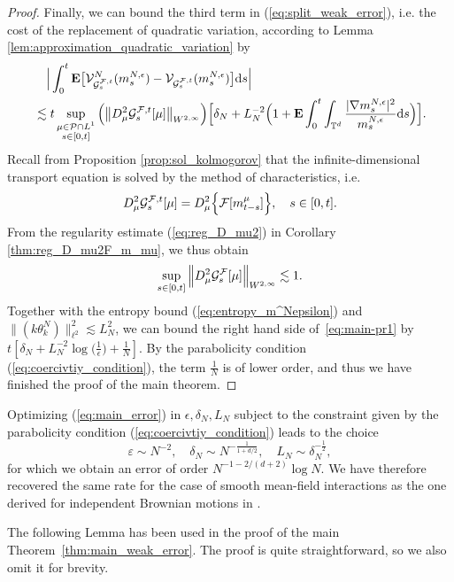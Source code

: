 \begin{proof}
Finally, we can bound the third term in (\ref{eq:split_weak_error}), i.e. the cost of the replacement of quadratic variation, according to Lemma \ref{lem:approximation_quadratic_variation} by
\begin{equation}\label{eq:main-pr1}
\begin{split}
     &\quad \Big|\int_0^t \mathbf{E}\big[\mathcal{V}^N_{\mathcal{G}_s^{\mathcal{F},t}}(m_s^{N,\epsilon}) - \mathcal{V}_{\mathcal{G}_s^{\mathcal{F},t}}(m_s^{N,\epsilon})\big]\mathrm{d}s\Big|\\
     &\lesssim t\sup_{\substack{\mu \in \mathcal{P} \cap L^1\\s \in [0,t]}}\Big(\big\|D^2_{\mu}\mathcal{G}^{\mathcal{F},t}_s[\mu]\big\|_{W^{2,\infty}}\Big)\Big[\delta_N + L_N^{-2}\Big(1 + \mathbf{E}\int_0^t\int_{\mathbb{T}^d}\frac{|\nabla m_s^{N,\epsilon}|^2}{m_s^{N,\epsilon}}\mathrm{d}s\Big)\Big].
\end{split}
\end{equation}
Recall from Proposition \ref{prop:sol_kolmogorov} that the infinite-dimensional transport equation is solved by the method of characteristics, i.e.
\[
D^2_{\mu} \mathcal{G}^{\mathcal{F},t}_s[\mu] = D^2_{\mu} \Big\{\mathcal{F}[m^{\mu}_{t-s}]\Big\}, \quad s \in [0,t].
\]
From the regularity estimate (\ref{eq:reg_D_mu2}) in Corollary \ref{thm:reg_D_mu2F_m_mu}, we thus obtain
\begin{align*}
    \sup_{s \in [0,t]}\Big\|D^2_{\mu} \mathcal{G}^{\mathcal{F}}_s[\mu]\Big\|_{W^{2,\infty}} \lesssim  1.
\end{align*}
Together with the entropy bound (\ref{eq:entropy_m^Nepsilon}) and $\|(k\theta_k^N)\|_{\ell^2}^2 \lesssim L_N^2$, we can bound the right hand side of~\eqref{eq:main-pr1} by $t [\delta_N + L_N^{-2} \log\big(\frac1\epsilon\big) + \frac{1}{N}]$. By the parabolicity condition (\ref{eq:coercivtiy_condition}), the term $\frac1N$ is of lower order, and thus we have finished the proof of the main theorem.
\end{proof}

\begin{rem}Optimizing (\ref{eq:main_error}) in $\epsilon, \delta_N, L_N$ subject to the constraint given by the parabolicity condition (\ref{eq:coercivtiy_condition}) leads to the choice 
\begin{equation}
   \varepsilon \sim N^{-2}, \quad \delta_N \sim N^{-\frac{1}{1+d/2}},\quad L_N \sim \delta^{-\frac{1}{2}}_N,
\end{equation}
for which we obtain an error of order $N^{-1- 2/(d+2)}\log N$. We have therefore recovered the same rate for the case of smooth mean-field interactions as the one derived for independent Brownian motions in \cite{DKP23}.
\end{rem}
The following Lemma has been used in the proof of the main Theorem~\ref{thm:main_weak_error}. The proof is quite straightforward, so we also omit it for brevity.

